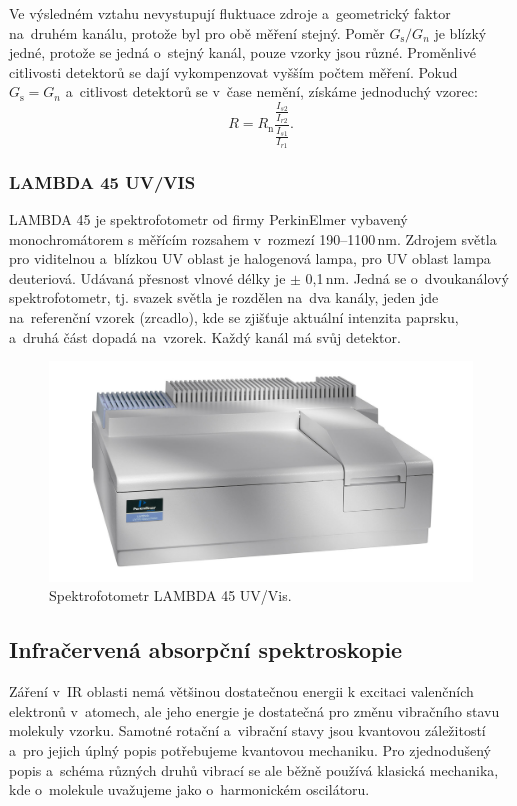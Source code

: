 \documentclass[12pt]{article}
\begin{document}
Ve výsledném vztahu nevystupují fluktuace zdroje a~geometrický faktor na~druhém kanálu, protože byl pro obě měření stejný. Poměr $G_\mathrm{s}/G_n$ je blízký jedné, protože se jedná o~stejný kanál, pouze vzorky jsou různé. Proměnlivé citlivosti detektorů se dají vykompenzovat vyšším počtem měření. Pokud $G_\mathrm{s} = G_n$ a~citlivost detektorů se v~čase nemění, získáme jednoduchý vzorec:
\begin{equation}R = R_\mathrm{n} \frac{\displaystyle\frac{I_{s2}}{I_{r2}} }{\displaystyle\frac{I_{s1}}{I_{r1}} } \mathrm{.}\end{equation}

\subsubsection{LAMBDA 45 UV/VIS}
LAMBDA 45 je spektrofotometr od firmy PerkinElmer vybavený monochromátorem s měřícím rozsahem v~rozmezí 190--1100\,nm. Zdrojem světla pro viditelnou a~blízkou UV oblast je halogenová lampa, pro UV oblast lampa deuteriová. Udávaná přesnost vlnové délky je $\pm$ 0,1\,nm. Jedná se o~dvoukanálový spektrofotometr, tj. svazek světla je rozdělen na~dva kanály, jeden jde na~referenční vzorek (zrcadlo), kde se zjišťuje aktuální intenzita paprsku, a~druhá část dopadá na~vzorek. Každý kanál má svůj detektor.

\begin{figure}
  \centering
  \includegraphics[width=120mm]{LAMBDA.jpg}
  \caption{Spektrofotometr LAMBDA 45 UV/Vis.}
  \label{lambdaimg}
\end{figure}




\subsection {Infračervená absorpční spektroskopie}
Záření v~IR oblasti nemá většinou dostatečnou energii k excitaci valenčních elektronů v~atomech, ale jeho energie je dostatečná pro změnu vibračního stavu molekuly vzorku. Samotné rotační a~vibrační stavy jsou kvantovou záležitostí a~pro jejich úplný popis potřebujeme kvantovou mechaniku. Pro zjednodušený popis a~schéma různých druhů vibrací se ale běžně používá klasická mechanika, kde o~molekule uvažujeme jako o~harmonickém oscilátoru.
\end{document}
